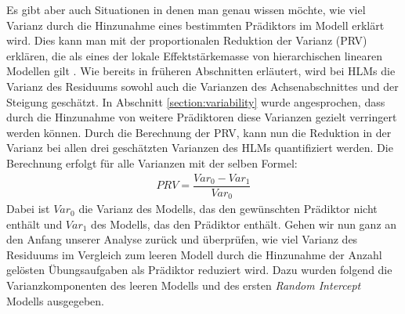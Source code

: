 \documentclass[12pt]{article}\usepackage[]{graphicx}\usepackage[]{color}
\begin{document}
Es gibt aber auch Situationen in denen man genau wissen möchte, wie viel Varianz durch die Hinzunahme eines bestimmten Prädiktors im Modell erklärt wird. Dies kann man mit der proportionalen Reduktion der Varianz (PRV) erklären, die als eines der lokale Effektstärkemasse von hierarchischen linearen Modellen gilt \citep{PEUGH201085, woltman2012introduction}. Wie bereits in früheren Abschnitten erläutert, wird bei HLMs die Varianz des Residuums sowohl auch die Varianzen des Achsenabschnittes und der Steigung geschätzt. In Abschnitt \ref{section:variability} wurde angesprochen, dass durch die Hinzunahme von weitere Prädiktoren diese Varianzen gezielt verringert werden können. Durch die Berechnung der PRV, kann nun die Reduktion in der Varianz bei allen drei geschätzten Varianzen des HLMs quantifiziert werden. Die Berechnung erfolgt für alle Varianzen mit der selben Formel:
\begin{equation} \label{eq:prv}
\begin{split}	
 PRV = \dfrac{Var_{0} - Var_{1}}{Var_{0}}
\end{split}	
\end{equation}
Dabei ist $Var_{0}$ die Varianz des Modells, das den gewünschten Prädiktor nicht enthält und $Var_{1}$ des Modells, das den Prädiktor enthält. Gehen wir nun ganz an den Anfang unserer Analyse zurück und überprüfen, wie viel Varianz des Residuums im Vergleich zum leeren Modell durch die Hinzunahme der Anzahl gelösten Übungsaufgaben als Prädiktor reduziert wird. Dazu wurden folgend die Varianzkomponenten des leeren Modells und des ersten \textit{Random Intercept} Modells ausgegeben. 
\end{document}
